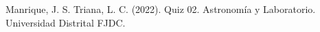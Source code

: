 \begin{multicols}{2}
   
   
   
   
   \begin{thebibliography}{99}
   
   
   
   Manrique, J. S. Triana, L. C. (2022). Quiz 02. Astronomía y Laboratorio. Universidad Distrital FJDC.
   
   
   \end{thebibliography}
   
   \end{multicols}
   
   
